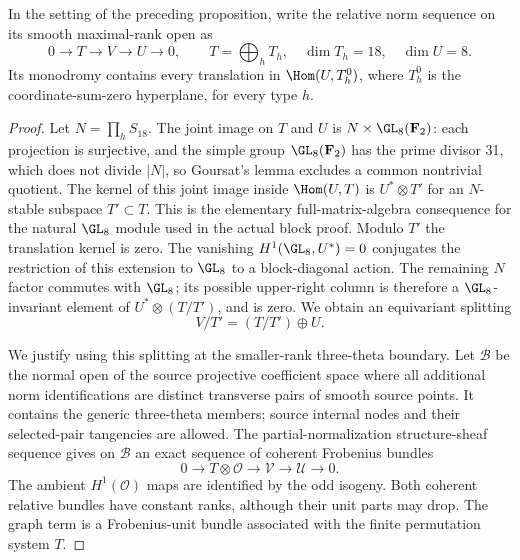\begin{proposition}
\label{prop:nonordinary-three-torsion-gluing-hearts-candidate}
In the setting of the preceding proposition, write the relative
norm sequence on its smooth maximal-rank open as
\[
                    0\longrightarrow T\longrightarrow V
                       \longrightarrow U\longrightarrow0,
       \qquad T=\bigoplus_h T_h,\quad \dim T_h=18,\quad\dim U=8.
\]
Its monodromy contains every translation in
$\Hom(U,T_h^0)$, where $T_h^0$ is the coordinate-sum-zero
hyperplane, for every type $h$.
\end{proposition}
\begin{proof}
Let $N=\prod_hS_{18}$. The joint image on $T$ and $U$ is
$N\times\GL_8(\mathbf F_2)$: each projection is surjective,
and the simple group $\GL_8(\mathbf F_2)$ has the prime divisor
31, which does not divide $|N|$, so Goursat's lemma excludes
a common nontrivial quotient. The kernel of this joint image
inside $\Hom(U,T)$ is $U^*\otimes T'$ for an $N$-stable
subspace $T'\subset T$. This is the elementary full-matrix-algebra
consequence for the natural $\GL_8$ module used in the actual
block proof. Modulo $T'$ the translation kernel is zero.
The vanishing $H^1(\GL_8,U^*)=0$ conjugates the restriction
of this extension to $\GL_8$ to a block-diagonal action.
The remaining $N$ factor commutes with $\GL_8$; its possible
upper-right column is therefore a $\GL_8$-invariant element
of $U^*\otimes(T/T')$, and is zero. We obtain an equivariant
splitting
\[
                         V/T'=(T/T')\oplus U.             \tag{NTG1}
\]

We justify using this splitting at the smaller-rank three-theta
boundary. Let $\mathcal B$ be the normal open of the source
projective coefficient space where all additional norm
identifications are distinct transverse pairs of smooth source
points. It contains the generic three-theta members; source
internal nodes and their selected-pair tangencies are allowed.
The partial-normalization structure-sheaf sequence gives on
$\mathcal B$ an exact sequence of coherent Frobenius bundles
\[
                         0\to T\otimes\mathcal O
                              \to\mathcal V\to\mathcal U\to0.
\]
The ambient $H^1(\mathcal O)$ maps are identified by the odd
isogeny. Both coherent relative bundles have constant ranks,
although their unit parts may drop. The graph term is a
Frobenius-unit bundle associated with the finite \etale
permutation system $T$.


\end{proof}
